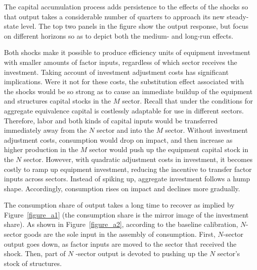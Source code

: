 \documentclass[12pt,fleqn]{article}
\begin{document}
{\normalsize
%
}

{\normalsize The capital accumulation process adds persistence to the
effects of the shocks so that output takes a considerable number of quarters
to approach its new steady-state level. The top two panels in the figure
show the output response, but focus on different horizons so as to depict
both the medium- and long-run effects. }

{\normalsize Both shocks make it possible to produce efficiency units of
equipment investment with smaller amounts of factor inputs, regardless of
which sector receives the investment. Taking account of investment
adjustment costs has significant implications. Were it not for these costs,
the substitution effect associated with the shocks would be so strong as to
cause an immediate buildup of the equipment and structures capital stocks in
the $M$ sector. Recall that under the conditions for aggregate equivalence
capital is costlessly adaptable for use in different sectors. Therefore,
labor and both kinds of capital inputs would be transferred immediately away
from the $N$ sector and into the $M$ sector. Without investment adjustment
costs, consumption would drop on impact, and then increase as higher
production in the $M$ sector would push up the equipment capital stock in
the $N$ sector. However, with quadratic adjustment costs in investment, it
becomes costly to ramp up equipment investment, reducing the incentive to
transfer factor inputs across sectors. Instead of spiking up, aggregate
investment follows a hump shape. Accordingly, consumption rises on impact and declines more
gradually.}

{\normalsize The consumption share of output takes a long time to recover as
implied by Figure~\ref{figure_a1} (the consumption share is the mirror image
of the investment share). As shown in Figure~\ref{figure_a2}, according to
the baseline calibration, $N$-sector goods are the sole input in the
assembly of consumption. First, $N$-sector output goes down, as factor
inputs are moved to the sector that received the shock. Then, part of $N$%
-sector output is devoted to pushing up the $N$ sector's stock of
structures.  }
\end{document}
